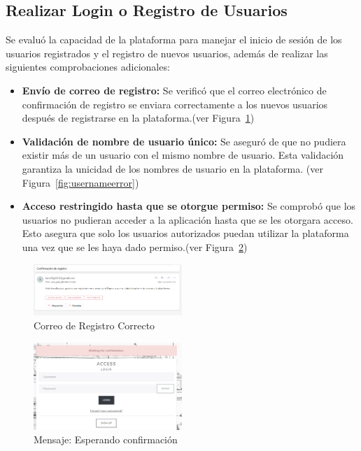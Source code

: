 \documentclass[a4paper, 12pt]{book}
\begin{document}
\subsection{ Realizar Login o Registro de Usuarios}
\label{sec:login-registro}
Se evaluó la capacidad de la plataforma para manejar el inicio de sesión de los usuarios registrados y el registro de nuevos usuarios, además de realizar las siguientes comprobaciones adicionales:
  \begin{itemize}
    \item \textbf{Envío de correo de registro:} Se verificó que el correo electrónico de confirmación de registro se enviara correctamente a los nuevos usuarios 
    después de registrarse en la plataforma.(ver Figura~\ref{fig:registrook})
    \item \textbf{Validación de nombre de usuario único:} Se aseguró de que no pudiera existir más de un usuario con el mismo nombre de usuario. Esta validación 
    garantiza la unicidad de los nombres de usuario en la plataforma. (ver Figura~\ref{fig:usernameerror})
    \item \textbf{Acceso restringido hasta que se otorgue permiso:}  Se comprobó que los usuarios no pudieran acceder a la aplicación hasta que se les otorgara acceso. 
    Esto asegura que solo los usuarios autorizados puedan utilizar la plataforma una vez que se les haya dado permiso.(ver Figura~\ref{fig:waiting})
  \end{itemize}

  \begin{figure}
    \centering
    \includegraphics[width=0.5\textwidth]{img/correoresgistro.png}
    \caption{Correo de Registro Correcto}
    \label{fig:registrook}
  \end{figure}
  \begin{figure}
    \centering
    \includegraphics[width=0.5\textwidth]{img/confacceso.png}
    \caption{Mensaje: Esperando confirmación}
    \label{fig:waiting}
  \end{figure}
\end{document}
